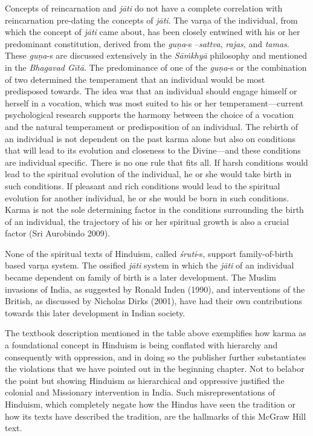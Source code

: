 Concepts of reincarnation and \textit{jāti} do not have a complete correlation with reincarnation pre-dating the concepts of \textit{jāti}. The varṇa of the individual, from which the concept of \textit{jāti} came about, has been closely entwined with his or her predominant constitution, derived from the \hbox{\textit{guṇa}}-s –\textit{sattva}, \textit{rajas}, and \textit{tamas}. These \textit{guṇa}-s are discussed extensively in the \textit{Sāṁkhyā} philosophy and mentioned in the \textit{Bhagavad Gītā}. The predominance of one of the \textit{guṇa}-s or the combination of two determined the temperament that an individual would be most predisposed towards. The idea was that an individual should engage himself or herself in a vocation, which was most suited to his or her temperament—current psychological research supports the harmony between the choice of a vocation and the natural temperament or predisposition of an individual. The rebirth of an individual is not dependent on the past karma alone but also on conditions that will lead to its evolution and closeness to the Divine—and these conditions are individual specific. There is no one rule that fits all. If harsh conditions would lead to the spiritual evolution of the individual, he or she would take birth in such conditions. If pleasant and rich conditions would lead to the spiritual evolution for another individual, he or she would be born in such conditions. Karma is not the sole determining factor in the conditions surrounding the birth of an individual, the trajectory of his or her spiritual growth is also a crucial factor (Sri Aurobindo 2009). 

None of the spiritual texts of Hinduism, called \textit{śruti}-s,  support family-of-birth based varṇa system. The ossified \textit{jāti} system in which the \textit{jāti} of an individual became dependent on family of birth is a later development. The Muslim invasions of India, as suggested by Ronald Inden (1990), and interventions of the British, as discussed by Nicholas Dirks (2001), have had their own contributions towards this later development in Indian society. 

The textbook description mentioned in the table above exemplifies how karma as a foundational concept in Hinduism is being conflated with hierarchy and consequently with oppression, and in doing so the publisher further substantiates the violations that we have pointed out in the beginning chapter. Not to belabor the point but showing Hinduism as hierarchical and oppressive justified the colonial and Missionary intervention in India. Such misrepresentations of Hinduism, which completely negate how the Hindus have seen the tradition or how its texts have described the tradition, are the hallmarks of this McGraw Hill text.


